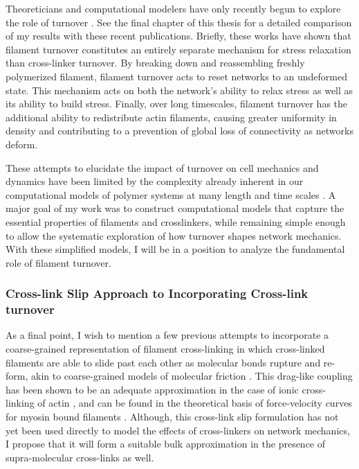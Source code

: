 Theoreticians and computational modelers have only recently begun to explore the role of turnover \cite{2015arXiv150706182H,Mak:2016aa,10.1371/journal.pone.0000696}. See the final chapter of this thesis for a detailed comparison of my results with these recent publications.  Briefly, these works have shown that filament turnover constitutes an entirely separate mechanism for stress relaxation than cross-linker turnover.  By breaking down and reassembling freshly polymerized filament, filament turnover acts to reset networks to an undeformed state.  This mechanism acts on both the network's ability to relax stress as well as its ability to build stress.  Finally, over long timescales, filament turnover has the additional ability to redistribute actin filaments, causing greater uniformity in density and contributing to a prevention of global loss of connectivity as networks deform.


These attempts to elucidate the impact of turnover on cell mechanics and dynamics have been limited by the complexity already inherent in our computational models of polymer systems at many length and time scales \cite{Mak2015}. A major goal of my work was to construct computational models that capture the essential properties of filaments and crosslinkers, while remaining simple enough to allow the systematic exploration of how turnover shapes network mechanics. With these simplified models, I will be in a position to analyze the fundamental role of filament turnover.










\subsubsection{Cross-link Slip Approach to Incorporating Cross-link turnover}

As a final point, I wish to mention a few previous attempts to incorporate a coarse-grained representation of filament cross-linking in which cross-linked filaments are able to slide past each other as molecular bonds rupture and re-form, akin to coarse-grained models of molecular friction \cite{theo_friction,theo_frictionSam,theo_molefric}.  This drag-like coupling has been shown to be an adequate approximation in the case of ionic cross-linking of actin \cite{mol_fric,theo_hydroish2}, and can be found in the theoretical basis of force-velocity curves for myosin bound filaments \cite{theo_frictionShila}. Although, this cross-link slip formulation has not yet been used directly to model the effects of cross-linkers on network mechanics, I propose that it will form a suitable bulk approximation in the presence of supra-molecular cross-links as well.






